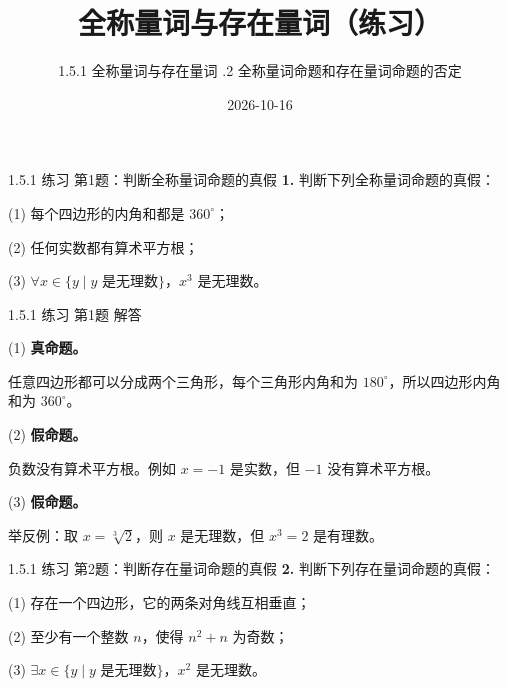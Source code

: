 \documentclass[10pt,aspectratio=169,serif]{beamer}
\title[全称量词与存在量词练习]{全称量词与存在量词（练习）}
\subtitle{1.5.1 全称量词与存在量词 \quad 1.5.2 全称量词命题和存在量词命题的否定}
\author{}
\institute{}
\date{2026-10-16}
\begin{document}
\begin{frame}
  \titlepage
\end{frame}

\begin{frame}[t]{1.5.1 练习 第1题：判断全称量词命题的真假}
\textbf{1.} 判断下列全称量词命题的真假：

\vspace{0.5em}
(1) 每个四边形的内角和都是 $360^\circ$；

\vspace{0.3em}
(2) 任何实数都有算术平方根；

\vspace{0.3em}
(3) $\forall x \in \{y \mid y \text{ 是无理数}\}$，$x^3$ 是无理数。
\end{frame}

\begin{frame}[t]{1.5.1 练习 第1题 解答}
\begin{tcolorbox}[colback=orange!10,colframe=orange,title=\textbf{解}]
(1) \textbf{真命题。}

\vspace{0.3em}
任意四边形都可以分成两个三角形，每个三角形内角和为 $180^\circ$，所以四边形内角和为 $360^\circ$。

\vspace{0.8em}
(2) \textbf{假命题。}

\vspace{0.3em}
负数没有算术平方根。例如 $x = -1$ 是实数，但 $-1$ 没有算术平方根。

\vspace{0.8em}
(3) \textbf{假命题。}

\vspace{0.3em}
举反例：取 $x = \sqrt[3]{2}$，则 $x$ 是无理数，但 $x^3 = 2$ 是有理数。
\end{tcolorbox}
\end{frame}

\begin{frame}[t]{1.5.1 练习 第2题：判断存在量词命题的真假}
\textbf{2.} 判断下列存在量词命题的真假：

\vspace{0.5em}
(1) 存在一个四边形，它的两条对角线互相垂直；

\vspace{0.3em}
(2) 至少有一个整数 $n$，使得 $n^2 + n$ 为奇数；

\vspace{0.3em}
(3) $\exists x \in \{y \mid y \text{ 是无理数}\}$，$x^2$ 是无理数。
\end{frame}
\end{document}
